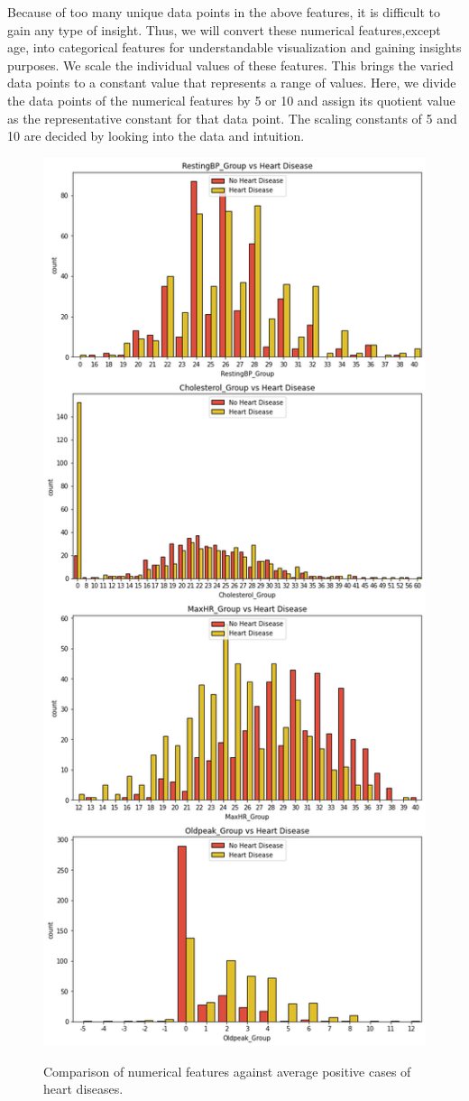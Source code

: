 Because of too many unique data points in the above features, it is difficult to gain any type of insight. Thus, we will convert these numerical features,except age, into categorical features for understandable visualization and gaining insights purposes. We scale the individual values of these features. This brings the varied data points to a constant value that represents a range of values. Here, we divide the data points of the numerical features by 5 or 10 and assign its quotient value as the representative constant for that data point. The scaling constants of 5 and 10 are decided by looking into the data and intuition. 
\begin{figure}[!htpb]
    \centering
    \includegraphics[width=0.5\linewidth]{Figures/Outputs/num-tar-var2.png}
    \label{Comparison between numerical features against average true cases of heart diseases}
    \caption{Comparison of numerical features against average positive cases of heart diseases.}
\end{figure}
